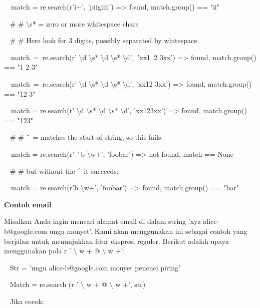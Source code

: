 \begin {enumerate}
\begin {enumerate}
\noindent
~~match = re.search(r'i+', 'piigiiii') =>  found, match.group() == "ii" \par
\vspace{12pt}
\noindent
~  $  \#  $ $  \#  $  $  \setminus  $s* = zero or more whitespace chars \par
\noindent
~  $  \#  $ $  \#  $ Here look for 3 digits, possibly separated by whitespace. \par
\noindent
~~match~=~re.search(r' $  \setminus  $d $  \setminus  $s* $  \setminus  $d $  \setminus  $s* $  \setminus  $d',~'xx1~2   3xx') =>  found, match.group() == "1 2   3" \par
\noindent
~~match~=~re.search(r' $  \setminus  $d $  \setminus  $s* $  \setminus  $d $  \setminus  $s* $  \setminus  $d', 'xx12  3xx') =>  found, match.group() == "12  3" \par
\noindent
~~match = re.search(r' $  \setminus  $d $  \setminus  $s* $  \setminus  $d $  \setminus  $s* $  \setminus  $d', 'xx123xx') =>  found, match.group() == "123" \par
\vspace{12pt}
\noindent
~  $  \#  $ $  \#  $  $  \string^  $ = matches the start of string, so this fails: \par
\noindent
~~match = re.search(r' $  \string^  $b $  \setminus  $w+', 'foobar') =>  not found, match == None \par
\noindent
~  $  \#  $ $  \#  $ but without the  $  \string^  $ it succeeds: \par
\noindent
~~match = re.search(r'b $  \setminus  $w+', 'foobar') =>  found, match.group() == "bar" \par
\vspace{12pt}
\vspace{12pt}
\noindent
{\fontsize{14pt}{14pt}\selectfont \textbf{Contoh email} \\} \par
Misalkan Anda ingin mencari alamat email di dalam string 'xyz alice-b@google.com ungu monyet'. Kami akan menggunakan ini sebagai contoh yang berjalan untuk menunjukkan fitur ekspresi reguler. Berikut adalah upaya menggunakan pola r ' $  \setminus  $ w + @  $  \setminus  $ w +': \par
\vspace{12pt}
\noindent
~ Str = 'ungu alice-b@google.com monyet pencuci piring' \par
\noindent
~ Match = re.search (r ' $  \setminus  $ w + @  $  \setminus  $ w +', str) \par
\noindent
~ Jika cocok: \par

\end{enumerate}
\end{enumerate}
